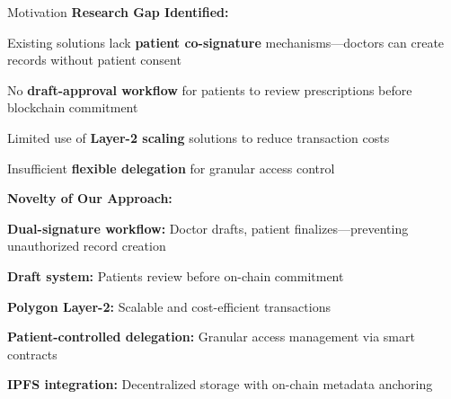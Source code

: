 \documentclass[10pt]{beamer}
\let\olditemize\itemize
\let\endolditemize\enditemize
\renewenvironment{itemize}
  {\olditemize\justifying}
  {\endolditemize}
\begin{document}
\begin{frame}{Motivation}
\textbf{Research Gap Identified:}
\begin{itemize}
\item Existing solutions lack \textbf{patient co-signature} mechanisms---doctors can create records without patient consent
\item No \textbf{draft-approval workflow} for patients to review prescriptions before blockchain commitment
\item Limited use of \textbf{Layer-2 scaling} solutions to reduce transaction costs
\item Insufficient \textbf{flexible delegation} for granular access control
\end{itemize}

\vspace{0.5cm}
\textbf{Novelty of Our Approach:}
\begin{itemize}
\item \textbf{Dual-signature workflow:} Doctor drafts, patient finalizes---preventing unauthorized record creation
\item \textbf{Draft system:} Patients review before on-chain commitment
\item \textbf{Polygon Layer-2:} Scalable and cost-efficient transactions
\item \textbf{Patient-controlled delegation:} Granular access management via smart contracts
\item \textbf{IPFS integration:} Decentralized storage with on-chain metadata anchoring
\end{itemize}
\end{frame}
\end{document}
